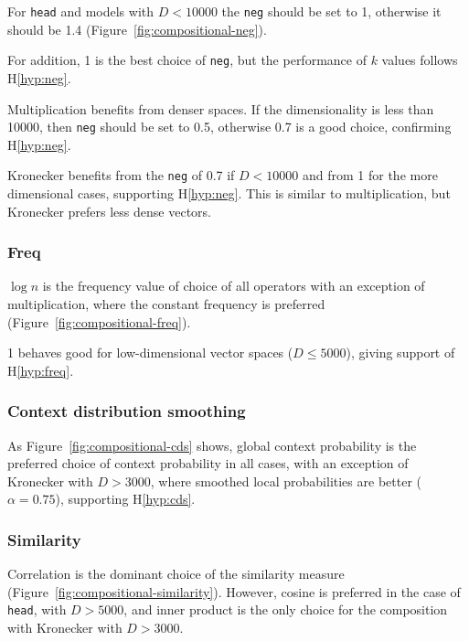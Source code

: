 

For \texttt{head} and models with $D < 10000$ the \texttt{neg} should be set to 1, otherwise it should be 1.4 (Figure~\ref{fig:compositional-neg}).

For addition, 1 is the best choice of \texttt{neg}, but the performance of $k$ values follows H\ref{hyp:neg}.

Multiplication benefits from denser spaces. If the dimensionality is less than 10000, then \texttt{neg} should be set to 0.5, otherwise 0.7 is a good choice, confirming H\ref{hyp:neg}.

Kronecker benefits from the \texttt{neg} of 0.7 if $D < 10000$ and from 1 for the more dimensional cases, supporting H\ref{hyp:neg}. This is similar to multiplication, but Kronecker prefers less dense vectors.

\subsubsection{Freq}
\label{sec:freq-compositional}

$\log n$ is the frequency value of choice of all operators with an exception of multiplication, where the constant frequency is preferred (Figure~\ref{fig:compositional-freq}).

1 behaves good for low-dimensional vector spaces ($D \leq 5000$), giving support of H\ref{hyp:freq}.

\subsubsection{Context distribution smoothing}
\label{sec:cont-distr-smooth-compositional}



As Figure~\ref{fig:compositional-cds} shows, global context probability is the preferred choice of context probability in all cases, with an exception of Kronecker with $D > 3000$, where smoothed local probabilities are better ($\alpha = 0.75$), supporting H\ref{hyp:cds}.

\subsubsection{Similarity}
\label{sec:similarity-compositional}

Correlation is the dominant choice of the similarity measure (Figure~\ref{fig:compositional-similarity}). However, cosine is preferred in the case of \texttt{head}, with $D > 5000$, and inner product is the only choice for the composition with Kronecker with $D > 3000$.

